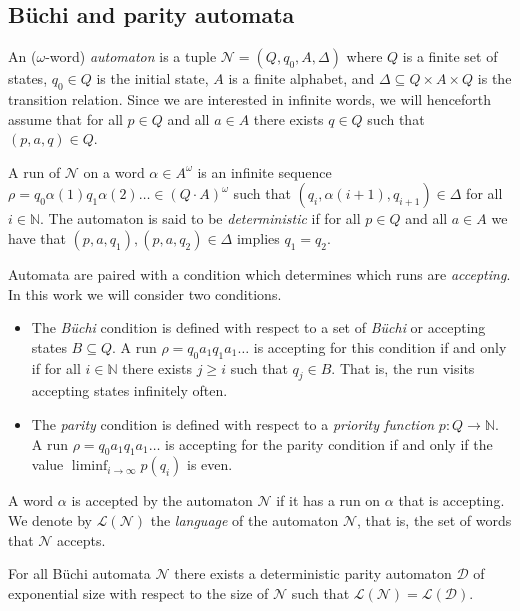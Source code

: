 \documentclass[runningheads,a4paper,draft]{llncs}
\newcommand{\calN}{\mathcal{N}}
\newcommand{\calD}{\mathcal{D}}
\newcommand{\lang}[1]{\mathcal{L}({#1})}
\begin{document}
\subsection{B\"uchi and parity automata}
\begin{definition}
  An ($\omega$-word) \emph{automaton} is a tuple $\calN =
  (Q,q_0,A,\Delta)$ where $Q$ is a finite set of states, $q_0 \in Q$ is the
  initial state, $A$ is a finite alphabet, and $\Delta \subseteq Q \times A
  \times Q$ is the transition relation. Since we are interested in infinite
  words, we will henceforth assume that for all $p \in Q$ and all $a \in A$
  there exists $q \in Q$ such that $(p,a,q) \in Q$.
\end{definition}
A run of $\calN$ on a word $\alpha \in A^\omega$ is an infinite sequence $\rho =
q_0 \alpha(1) q_1 \alpha(2) \dots \in (Q\cdot A)^\omega$ such that
$(q_i,\alpha(i+1),q_{i+1}) \in \Delta$ for all $i \in \mathbb{N}$. The automaton
is said to be \emph{deterministic} if for all $p \in Q$ and all $a \in A$ we
have that $(p,a,q_1), (p,a,q_2) \in \Delta$ implies $q_1 = q_2$.

Automata are paired with a condition which determines which runs are
\emph{accepting}. In this work we will consider two conditions.
\begin{itemize}
  \item The \emph{B\"uchi} condition is defined with respect to a set of
    \emph{B\"uchi} or accepting states $B \subseteq Q$. A run $\rho = q_0
    a_1 q_1 a_1 \dots$ is accepting for this condition if and only if for
    all $i \in \mathbb{N}$ there exists $j \ge i$ such that $q_j \in B$.
    That is, the run visits accepting states infinitely often.
  \item The \emph{parity} condition is defined with respect to a
    \emph{priority function} $p : Q \to \mathbb{N}$. A run $\rho = q_0 a_1
    q_1 a_1 \dots$ is accepting for the parity condition if and only if the
    value $\liminf_{i \to \infty} p(q_i)$ is even.
\end{itemize}
A word $\alpha$ is accepted by the automaton $\calN$ if it has a run on
$\alpha$ that is accepting.  We denote by $\lang{\calN}$ the \emph{language} of
the automaton $\calN$, that is, the set of words that $\calN$ accepts.

\begin{proposition}
  For all B\"uchi automata $\calN$ there exists a deterministic parity
  automaton $\calD$ of exponential size with respect to the size of $\calN$
  such that $\lang{\calN} = \lang{\calD}$.
\end{proposition}
\end{document}
